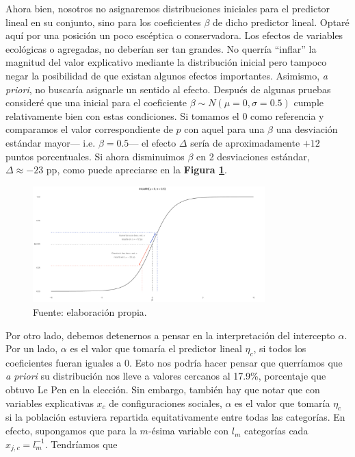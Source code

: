 Ahora bien, nosotros no asignaremos distribuciones iniciales para el predictor lineal en su conjunto, sino para los coeficientes $\beta$ de dicho predictor lineal. Optaré aquí por una posición un poco escéptica o conservadora. Los efectos de variables ecológicas o agregadas, no deberían ser tan grandes. No querría ``inflar'' la magnitud del valor explicativo mediante la distribución inicial pero tampoco negar la posibilidad de que existan algunos efectos importantes. Asimismo, \textit{a priori}, no buscaría asignarle un sentido al efecto. Después de algunas pruebas consideré que una inicial para el coeficiente $\beta\sim N(\mu=0,\sigma=0.5)$ cumple relativamente bien con estas condiciones. Si tomamos el $0$ como referencia y comparamos el valor correspondiente de $p$ con aquel para una $\beta$ una desviación estándar mayor--- i.e. $\beta = 0.5$--- el efecto $\Delta$ sería de aproximadamente $+12$ puntos porcentuales. Si ahora disminuimos $\beta$ en 2 desviaciones estándar,  $\Delta \approx -23$ pp, como puede apreciarse en la \textbf{Figura \ref{fig:Inicial_Coef}}.

\begin{figure}[h]
	\centering
	\includegraphics[width = 0.8\textwidth]{Figs/Modelado/Inicial_N0_un_medio}
	\caption{Fuente: elaboración propia.}
	\label{fig:Inicial_Coef}
\end{figure}

Por otro lado, debemos detenernos a pensar en la interpretación del intercepto $\alpha$. Por un lado, $\alpha$ es el valor que tomaría el predictor lineal $\eta_c$, si todos los coeficientes fueran iguales a $0$. Esto nos podría hacer pensar que querríamos que \textit{a priori} su distribución nos lleve a valores cercanos al  17.9\%, porcentaje que obtuvo Le Pen en la elección. Sin embargo, también hay que notar que con variables explicativas $x_c$ de configuraciones sociales, $\alpha$ es el valor que tomaría $\eta_c$ si la población estuviera repartida equitativamente entre todas las categorías. En efecto, supongamos que para la $m$-ésima variable con $l_m$ categorías cada $x_{j,c}=l_m^{-1}$. Tendríamos que

